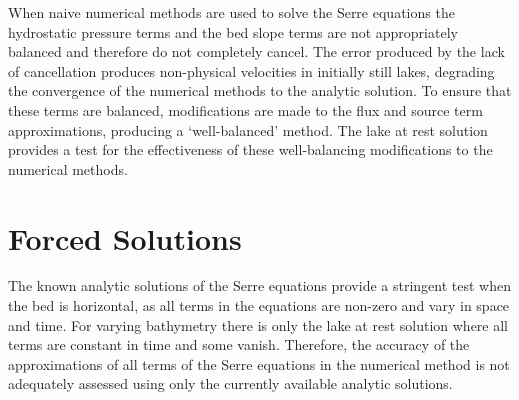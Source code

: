 When naive numerical methods are used to solve the Serre equations the hydrostatic pressure terms and the bed slope terms are not appropriately balanced and therefore do not completely cancel. The error produced by the lack of cancellation produces non-physical velocities in initially still lakes, degrading the convergence of the numerical methods to the analytic solution. To ensure that these terms are balanced, modifications are made to the flux and source term approximations, producing a `well-balanced' method. The lake at rest solution provides a test for the effectiveness of these well-balancing modifications to the numerical methods.


\section{Forced Solutions}
The known analytic solutions of the Serre equations provide a stringent test when the bed is horizontal, as all terms in the equations are non-zero and vary in space and time. For varying bathymetry there is only the lake at rest solution where all terms are constant in time and some vanish. Therefore, the accuracy of the approximations of all terms of the Serre equations in the numerical method is not adequately assessed using only the currently available analytic solutions.

